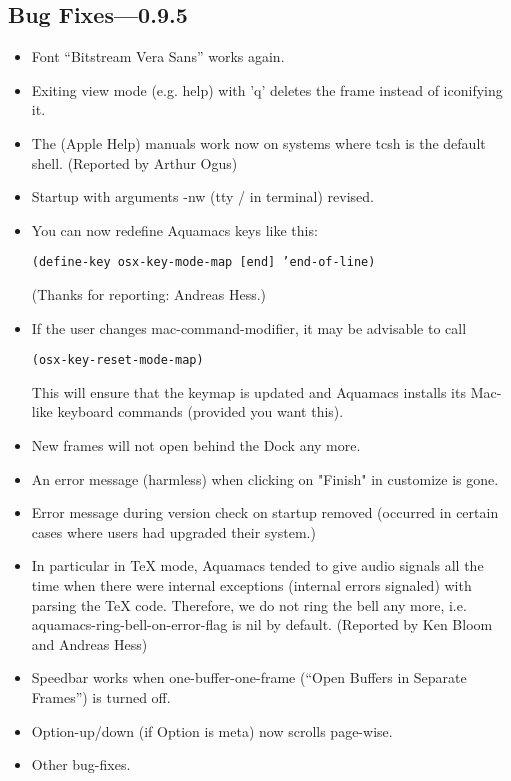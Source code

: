 \subsection{Bug Fixes---0.9.5}


\begin{itemize}



\item Font ``Bitstream Vera Sans'' works again.  	


\item Exiting view mode (e.g. help) with 'q' deletes the frame instead of
	iconifying it.

\item The (Apple Help) manuals work now on systems where tcsh
	is the default shell.  (Reported by Arthur Ogus)
	

\item Startup with arguments -nw (tty / in terminal) revised.
	


\item You can now redefine Aquamacs keys like this:

	\texttt{(define-key osx-key-mode-map [end] 'end-of-line)}

	(Thanks for reporting: Andreas Hess.)
	
\item If the user changes mac-command-modifier, it may be advisable to call

	 \texttt{(osx-key-reset-mode-map)}

	This will ensure that the keymap is updated and Aquamacs installs
	its Mac-like keyboard commands (provided you want this).

\item New frames will not open behind the Dock any more.


\item An error message (harmless) when clicking on "Finish" in customize is gone.

\item Error message during version check on startup removed (occurred in
	certain cases where users had upgraded their system.)

\item In particular in TeX mode, Aquamacs tended to give audio signals all the
	time when there were internal exceptions (internal errors signaled) with parsing the TeX code. Therefore, we do not ring the bell any more,
	i.e. aquamacs-ring-bell-on-error-flag is nil by default.
	(Reported by Ken Bloom and Andreas Hess)
\item Speedbar works when one-buffer-one-frame (``Open Buffers in Separate
	Frames'') is turned off. 
\item Option-up/down (if Option is meta) now scrolls page-wise.


\item Other bug-fixes.

\end{itemize}
	
